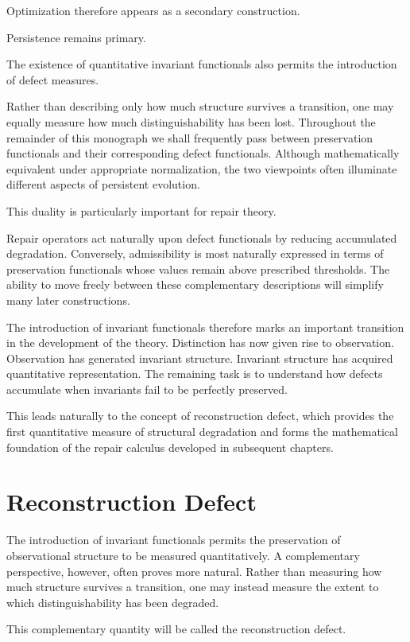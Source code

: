 \documentclass[11pt]{book}
\numberwithin{equation}{chapter}
\theoremstyle{definition}
\theoremstyle{plain}
\begin{document}
Optimization therefore appears as a secondary construction.

Persistence remains primary.

The existence of quantitative invariant functionals also permits the introduction of defect measures.

Rather than describing only how much structure survives a transition, one may equally measure how much distinguishability has been lost. Throughout the remainder of this monograph we shall frequently pass between preservation functionals and their corresponding defect functionals. Although mathematically equivalent under appropriate normalization, the two viewpoints often illuminate different aspects of persistent evolution.

This duality is particularly important for repair theory.

Repair operators act naturally upon defect functionals by reducing accumulated degradation. Conversely, admissibility is most naturally expressed in terms of preservation functionals whose values remain above prescribed thresholds. The ability to move freely between these complementary descriptions will simplify many later constructions.

The introduction of invariant functionals therefore marks an important transition in the development of the theory. Distinction has now given rise to observation. Observation has generated invariant structure. Invariant structure has acquired quantitative representation. The remaining task is to understand how defects accumulate when invariants fail to be perfectly preserved.

This leads naturally to the concept of reconstruction defect, which provides the first quantitative measure of structural degradation and forms the mathematical foundation of the repair calculus developed in subsequent chapters.

\section{Reconstruction Defect}

The introduction of invariant functionals permits the preservation of observational structure to be measured quantitatively. A complementary perspective, however, often proves more natural. Rather than measuring how much structure survives a transition, one may instead measure the extent to which distinguishability has been degraded.

This complementary quantity will be called the reconstruction defect.
\end{document}
